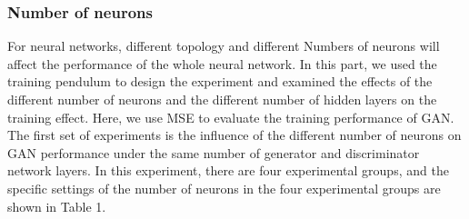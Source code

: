 \documentclass[11pt,a4paper]{article}
\begin{document}
\subsubsection{Number of neurons}
For neural networks, different topology and different Numbers of neurons will affect the performance of the whole neural network. In this part, we used the training pendulum to design the experiment and examined the effects of the different number of neurons and the different number of hidden layers on the training effect. Here, we use MSE to evaluate the training performance of GAN. 
\\
\newline
The first set of experiments is the influence of the different number of neurons on GAN performance under the same number of generator and discriminator network layers. In this experiment, there are four experimental groups, and the specific settings of the number of neurons in the four experimental groups are shown in Table 1. 
\end{document}
